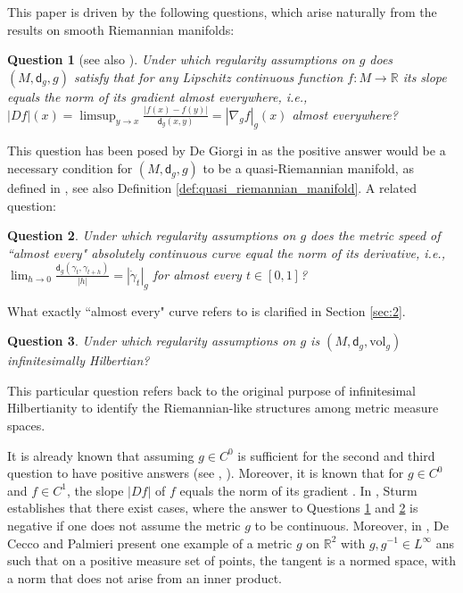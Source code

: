 \documentclass[a4paper,10pt]{article}
\newtheorem{question}{Question}
\numberwithin{equation}{section}
\newcommand{\R}{\mathbb{R}}
\newcommand{\vol}{\mathrm{vol}}
\newcommand{\sfd}{\mathsf d}
\begin{document}
This paper is driven by the following questions, which arise naturally from the results on smooth Riemannian manifolds: 
\begin{question}[see also \cite{de1990conversazioni}]\label{q1}
    Under which regularity assumptions on $g$ does $(M, \sfd_g, g)$ satisfy that for any Lipschitz continuous function $f:M \to \R$ its slope equals the norm of its gradient almost everywhere, i.e., $|Df|(x)=\limsup_{y \to x} \frac{|f(x)-f(y)|}{\sfd_g(x,y)}= |\nabla_g f|_g(x)$ almost everywhere?
\end{question}
This question has been posed by De Giorgi in \cite{de1990conversazioni} as the positive answer would be a necessary condition for  $(M, \sfd_g, g)$ to be a quasi-Riemannian manifold, as defined in \cite{de1990conversazioni}, see also Definition \ref{def:quasi_riemannian_manifold}.  A related question:
\begin{question}\label{q2}
   Under which regularity assumptions on $g$ does the metric speed of ``almost every" absolutely continuous curve equal the norm of its derivative, i.e.,  $\lim_{h \to 0} \frac{\sfd_g(\gamma_t, \gamma_{t+h})}{|h|}=|\dot{\gamma}_t|_g$ for almost every $t \in [0,1]$?
\end{question}
What exactly ``almost every" curve refers to is clarified in Section \ref{sec:2}. 
\begin{question}\label{q3}
   Under which regularity assumptions on $g$ is $(M, \sfd_g, \vol_g)$ infinitesimally Hilbertian?
\end{question}
This particular question refers back to the original purpose of infinitesimal Hilbertianity to identify the Riemannian-like structures among metric measure spaces. 

It is already known that assuming $g \in C^0$ is sufficient for the second and third question to have positive answers (see \cite{burtscher2012length}, \cite{mondino2025equivalence}). Moreover, it is known that for $g \in C^0$ and $f \in C^1$, the slope $|Df|$ of $f$ equals the norm of its gradient \cite{mondino2025equivalence}.
In \cite{sturm1997diffusion}, Sturm establishes that there exist cases, where the answer to Questions \ref{q1} and \ref{q2} is negative if one does not assume the metric $g$ to be continuous. 
Moreover, in \cite{de1995lip}, De Cecco and Palmieri present one example of a metric $g$ on $\R^2$ with $g, g^{-1} \in L^\infty$ ans such that on a positive measure set of points, the tangent is a normed space, with a norm that does not arise from an inner product. 
\end{document}
